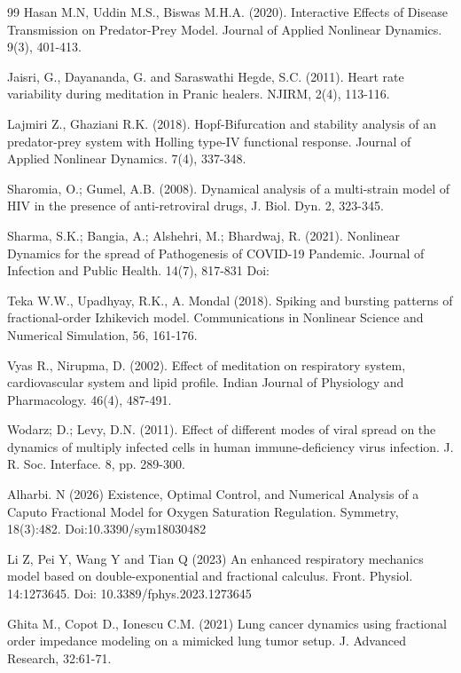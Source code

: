\documentclass{default}
\begin{document}
\begin{thebibliography}{99}
Hasan M.N, Uddin M.S., Biswas M.H.A. (2020). Interactive Eﬀects of Disease Transmission on Predator-Prey Model. Journal of Applied Nonlinear Dynamics. 9(3), 401-413.

Jaisri, G., Dayananda, G. and Saraswathi Hegde, S.C. (2011). Heart rate variability during meditation in Pranic healers. NJIRM, 2(4), 113-116.

Lajmiri Z., Ghaziani R.K. (2018). Hopf-Bifurcation and stability analysis of an predator-prey system with Holling type-IV functional response. Journal of Applied Nonlinear Dynamics. 7(4), 337-348.

Sharomia, O.; Gumel, A.B. (2008). Dynamical analysis of a multi-strain model of HIV in the presence of anti-retroviral drugs, J. Biol. Dyn. 2, 323-345.

Sharma, S.K.; Bangia, A.; Alshehri, M.;
Bhardwaj, R. (2021). Nonlinear Dynamics for the spread of Pathogenesis of COVID-19 Pandemic. Journal of Infection and Public Health. 14(7), 817-831 Doi:

Teka W.W., Upadhyay, R.K., A. Mondal (2018). Spiking and bursting patterns of fractional-order Izhikevich model. Communications in Nonlinear Science and Numerical Simulation, 56, 161-176.

Vyas R., Nirupma, D. (2002). Effect of meditation on respiratory system, cardiovascular system and lipid profile. Indian Journal of Physiology and Pharmacology. 46(4), 487-491.

Wodarz; D.; Levy, D.N. (2011). Effect of different modes of viral spread on the dynamics of multiply infected cells in human immune-deficiency virus infection. J. R. Soc. Interface. 8, pp. 289-300.

Alharbi. N (2026) Existence, Optimal Control, and Numerical Analysis of a Caputo Fractional Model for Oxygen Saturation Regulation. Symmetry, 18(3):482. Doi:10.3390/sym18030482

Li Z, Pei Y, Wang Y and Tian Q (2023) An enhanced respiratory mechanics model based on double-exponential and fractional calculus. Front. Physiol. 14:1273645. Doi: 10.3389/fphys.2023.1273645

Ghita M., Copot D., Ionescu C.M. (2021) Lung cancer dynamics using fractional order impedance modeling on a mimicked lung tumor setup. J. Advanced Research, 32:61-71.

\end{thebibliography}
\end{document}
